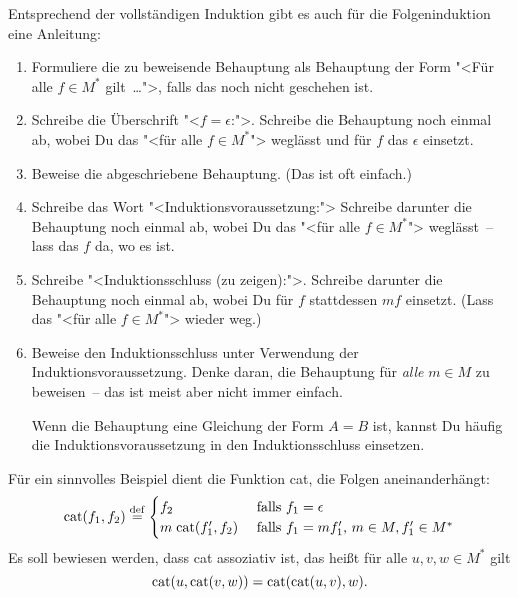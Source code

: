 Entsprechend der vollständigen Induktion gibt es auch für die
Folgeninduktion eine Anleitung:
%
\begin{enumerate}
\item Formuliere die zu beweisende Behauptung als Behauptung der
  Form "<Für alle $f\in M^\ast$ gilt~\ldots">, falls das noch nicht
  geschehen ist.
\item Schreibe die Überschrift "<$f = \epsilon$:">. Schreibe die
  Behauptung noch einmal ab, wobei Du das "<für alle $f\in M^\ast$"> weglässt und für $f$ das $\epsilon$ einsetzt.
\item Beweise die abgeschriebene Behauptung.  (Das ist oft
  einfach.)
\item Schreibe das Wort "<Induktionsvoraussetzung:"> Schreibe
  darunter die Behauptung noch einmal ab, wobei Du das "<für
  alle $f\in M^\ast$"> weglässt~-- lass das $f$ da, wo es ist.
\item Schreibe "<Induktionsschluss (zu zeigen):">.
  Schreibe darunter die Behauptung noch einmal ab, wobei Du für
  $f$ stattdessen $mf$ einsetzt.  (Lass das "<für alle
  $f\in M^\ast$"> wieder weg.)
\item Beweise den Induktionsschluss unter Verwendung der
  Induktionsvoraussetzung.  Denke daran, die Behauptung für
  \emph{alle} $m\in M$ zu beweisen~-- das ist meist aber nicht immer
  einfach.

  Wenn die Behauptung eine Gleichung der Form $A = B$ ist, kannst
  Du häufig die Induktionsvoraussetzung in den Induktionsschluss einsetzen.
\end{enumerate}
%
Für ein sinnvolles Beispiel dient die Funktion cat, die Folgen
aneinanderhängt:
%
\begin{displaymath}
  \textrm{cat}(f_1, f_2)
  \stackrel{\rm def}{=}
  \begin{cases}
    f_2 & \textrm{ falls $f_1 = \epsilon$}\\
    m\;\textrm{cat}(f_1', f_2)& \textrm{ falls $f_1 = mf_1'$, $m\in M, f_1'\in M^\ast$}
  \end{cases}
\end{displaymath}
Es soll bewiesen werden, dass cat assoziativ\label{Assoziativität}\label{page:assoziativitaet} ist, das heißt für alle 
$u,v,w \in M^{\ast}$ gilt
\begin{displaymath}
  {\rm cat}(u,{\rm cat}(v,w))  = {\rm cat}({\rm cat}(u,v),w).
\end{displaymath}

